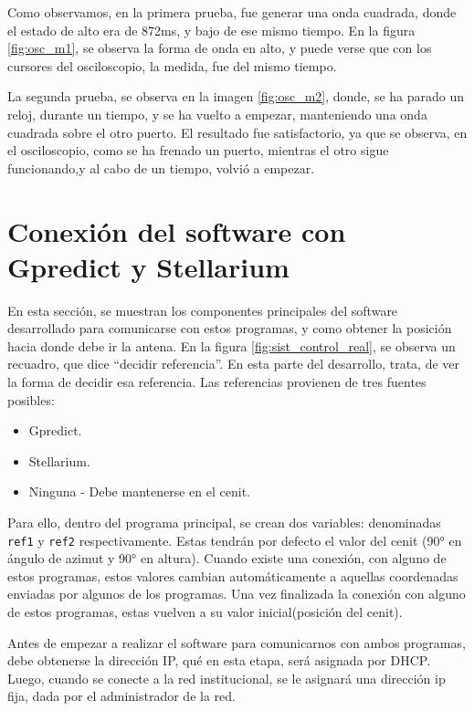 Como observamos, en la primera prueba, fue generar una onda cuadrada, donde el estado de alto era de 872ms, y bajo de ese mismo tiempo. En la figura \ref{fig:osc_m1}, se observa la forma de onda en alto, y puede verse que con los cursores del osciloscopio, la medida, fue del mismo tiempo. 


La segunda prueba, se observa en la imagen \ref{fig:osc_m2}, donde, se ha parado un reloj, durante un tiempo, y se ha vuelto a empezar, manteniendo una onda cuadrada sobre el otro puerto. El resultado fue satisfactorio, ya que se observa, en el osciloscopio, como se ha frenado un puerto, mientras el otro sigue funcionando,y al cabo de un tiempo, volvió a empezar.  
 

\section{Conexión del software con Gpredict y Stellarium} 

En esta sección, se muestran los componentes principales del software desarrollado para comunicarse con estos programas, y como obtener la posición hacia donde debe ir la antena. En la figura \ref{fig:sist_control_real}, se observa un recuadro, que dice ``decidir referencia''. En esta parte del desarrollo, trata, de ver la forma de decidir esa referencia. Las referencias provienen de tres fuentes posibles: 
\begin{itemize}
	\item Gpredict.  
	\item Stellarium. 
	\item Ninguna - Debe mantenerse en el cenit.
\end{itemize} 

Para ello, dentro del programa principal, se crean dos variables: denominadas \texttt{ref1} y \texttt{ref2} respectivamente. Estas tendrán por defecto el valor del cenit (90° en ángulo de azimut y 90° en altura). Cuando existe una conexión, con alguno de estos programas, estos valores cambian automáticamente a aquellas coordenadas enviadas por algunos de los programas. Una vez finalizada la conexión con alguno de estos programas, estas vuelven a su valor inicial(posición del cenit). 

Antes de empezar a realizar el software para comunicarnos con ambos programas, debe obtenerse la dirección IP, qué en esta etapa, será asignada por DHCP. Luego, cuando se conecte a la red institucional, se le asignará una dirección ip fija, dada por el administrador de la red. 

